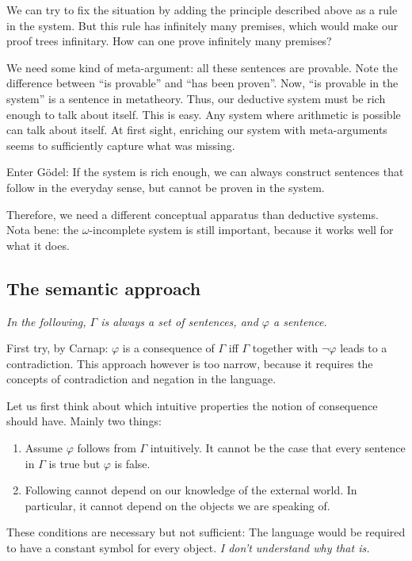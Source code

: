 \documentclass[a4paper]{article}
\begin{document}
We can try to fix the situation by adding the principle described above as a
rule in the system.  But this rule has infinitely many premises, which
would make our proof trees infinitary.  How can one prove infinitely many
premises?

We need some kind of meta-argument: all these sentences are provable.  Note the
difference between ``is provable'' and ``has been proven''.  Now, ``is provable
in the system'' is a sentence in metatheory.  Thus, our deductive system must be
rich enough to talk about itself.  This is easy.  Any system where arithmetic is
possible can talk about itself.  At first sight, enriching our system with
meta-arguments seems to sufficiently capture what was missing.

Enter Gödel: If the system is rich enough, we can always construct sentences
that follow in the everyday sense, but cannot be proven in the system.

Therefore, we need a different conceptual apparatus than deductive systems.
Nota bene: the $\omega$-incomplete system is still important, because it works
well for what it does.

\subsection{The semantic approach}

\emph{In the following, $\Gamma$ is always a set of sentences, and $\varphi$ a
sentence.}

First try, by Carnap: $\varphi$ is a consequence of $\Gamma$ iff $\Gamma$
together with $\neg\varphi$ leads to a contradiction.  This approach however is
too narrow, because it requires the concepts of contradiction and negation in
the language.

Let us first think about which intuitive properties the notion of consequence
should have.  Mainly two things:
\begin{enumerate}
  \item Assume $\varphi$ follows from $\Gamma$ intuitively.  It cannot be the
  case that every sentence in $\Gamma$ is true but $\varphi$ is false.

  \item Following cannot depend on our knowledge of the external world.  In
  particular, it cannot depend on the objects we are speaking of.
\end{enumerate}
These conditions are necessary but not sufficient:  The language would be
required to have a constant symbol for every object.  \emph{I don't understand
why that is.}
\end{document}

